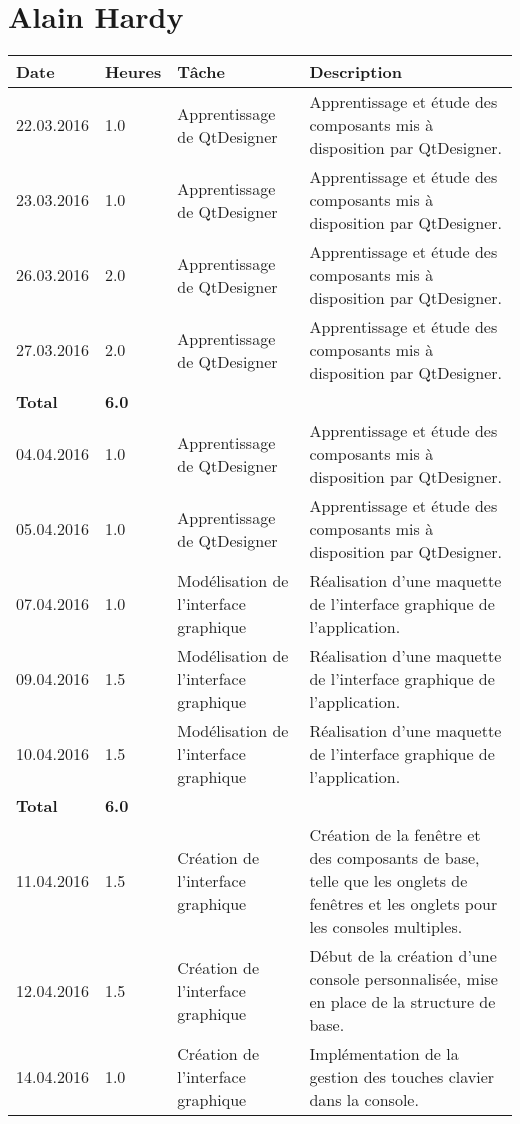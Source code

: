 \documentclass[french]{article}
\begin{document}
	\section*{Alain Hardy}
	\begin{longtable}{p{}|p{}|p{}|p{}}
		Date&Heures&Tâche&Description\\
		\hline\hline
		22.03.2016 & 1.0 & Apprentissage de QtDesigner & Apprentissage et étude des composants mis à disposition par QtDesigner.\\
		23.03.2016 & 1.0 & Apprentissage de QtDesigner & Apprentissage et étude des composants mis à disposition par QtDesigner.\\
		26.03.2016 & 2.0 & Apprentissage de QtDesigner & Apprentissage et étude des composants mis à disposition par QtDesigner.\\
		27.03.2016 & 2.0 & Apprentissage de QtDesigner & Apprentissage et étude des composants mis à disposition par QtDesigner.\\
		\textbf{Total} & \textbf{6.0} &&\\
		\hline
		04.04.2016 & 1.0 & Apprentissage de QtDesigner & Apprentissage et étude des composants mis à disposition par QtDesigner.\\
		05.04.2016 & 1.0 & Apprentissage de QtDesigner & Apprentissage et étude des composants mis à disposition par QtDesigner.\\
		07.04.2016 & 1.0 & Modélisation de l'interface graphique & Réalisation d'une maquette de l'interface graphique de l'application.\\
		09.04.2016 & 1.5 & Modélisation de l'interface graphique & Réalisation d'une maquette de l'interface graphique de l'application.\\
		10.04.2016 & 1.5 & Modélisation de l'interface graphique & Réalisation d'une maquette de l'interface graphique de l'application.\\
		\textbf{Total} & \textbf{6.0} &&\\
		\hline
		11.04.2016 & 1.5 & Création de l'interface graphique & Création de la fenêtre et des composants de base, telle que les onglets de fenêtres et les onglets pour les consoles multiples.\\
		12.04.2016 & 1.5 & Création de l'interface graphique & Début de la création d'une console personnalisée, mise en place de la structure de base.\\
		14.04.2016 & 1.0 & Création de l'interface graphique & Implémentation de la gestion des touches clavier dans la console.\\

\end{longtable}
\end{document}
